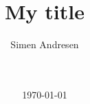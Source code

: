 


\title{My title}
\author{Simen Andresen}
\date{\ \\ \ \\ \today}



\pagestyle{empty}
\titleAT

\cleardoublepage






\pagestyle{empty}
\cleardoublepage
{}
\tableofcontents

\cleardoublepage

\pagestyle{fancy}
\chead{}
\setcounter{page}{1}

\lfoot{\thepage}




\newpage

%


